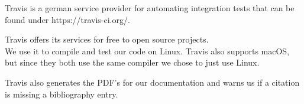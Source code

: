 Travis is a german service provider for automating integration tests that can be found under https://travis-ci.org/.

Travis offers its services for free to open source projects. \cite{travispricing} \\
We use it to compile and test our code on Linux. Travis also supports macOS, but since they both use the same compiler we chose to just use Linux.  

Travis also generates the PDF's for our documentation and warns us if a citation is missing a bibliography entry.  
